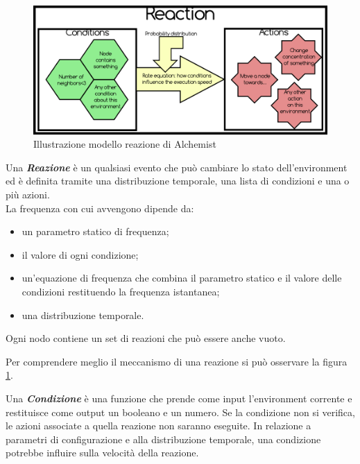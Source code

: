 \begin{figure}[h] %
\begin{center} %
\includegraphics[width=14cm]{images/AlchemistReaction.png} %
\caption[Illustrazione modello reazione di Alchemist]{Illustrazione modello reazione di Alchemist} \label{fig:alchemistReaction}
\end{center}
\end{figure}

Una \textbf{\textit{Reazione}} è un qualsiasi evento che può cambiare lo stato dell'environment ed è definita tramite una distribuzione temporale, una lista di condizioni e una o più azioni.
\\La frequenza con cui avvengono dipende da:
\begin{itemize}
\item un parametro statico di frequenza;
\item il valore di ogni condizione;
\item un'equazione di frequenza che combina il parametro statico e il valore delle condizioni restituendo la frequenza istantanea;
\item una distribuzione temporale.
\end{itemize}
Ogni nodo contiene un set di reazioni che può essere anche vuoto.

Per comprendere meglio il meccanismo di una reazione si può osservare la figura \ref{fig:alchemistReaction}.

Una \textbf{\textit{Condizione}} è una funzione che prende come input l'environment corrente e restituisce come output un booleano e un numero. Se la condizione non si verifica, le azioni associate a quella reazione non saranno eseguite. In relazione a parametri di configurazione e alla distribuzione temporale, una condizione potrebbe influire sulla velocità della reazione.

